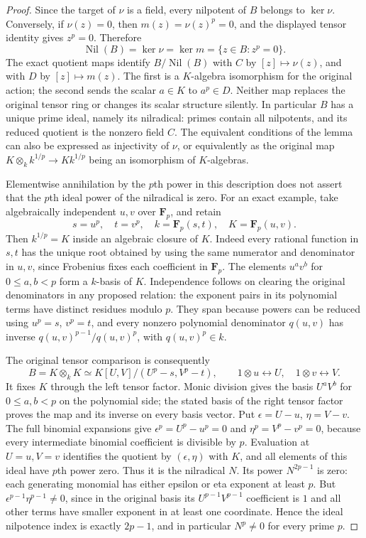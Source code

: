 \begin{proof}
Since the target of $\nu$ is a field, every
nilpotent of $B$ belongs to $\ker\nu$. Conversely,
if $\nu(z)=0$, then $m(z)=\nu(z)^p=0$, and the
displayed tensor identity gives $z^p=0$. Therefore
$$
\operatorname{Nil}(B)=\ker\nu=\ker m
=\{z\in B:z^p=0\}.
$$
The exact quotient maps identify
$B/\operatorname{Nil}(B)$ with $C$ by $[z]\mapsto\nu(z)$,
and with $D$ by $[z]\mapsto m(z)$. The first is a
$K$-algebra isomorphism for the original action;
the second sends the scalar $a\in K$ to $a^p\in D$.
Neither map replaces the original tensor ring or
changes its scalar structure silently. In particular
$B$ has a unique prime ideal, namely its nilradical:
primes contain all nilpotents, and its reduced
quotient is the nonzero field $C$. The equivalent
conditions of the lemma can also be expressed as
injectivity of $\nu$, or equivalently as the original
map $K\otimes_k k^{1/p}\to Kk^{1/p}$ being an
isomorphism of $K$-algebras.

Elementwise annihilation by the $p$th power in this
description does not assert that the $p$th ideal
power of the nilradical is zero. For an exact
example, take algebraically independent $u,v$
over $\mathbf F_p$, and retain
$$
s=u^p,\quad t=v^p,\quad
k=\mathbf F_p(s,t),\quad K=\mathbf F_p(u,v).
$$
Then $k^{1/p}=K$ inside an algebraic closure of $K$.
Indeed every rational function in $s,t$ has the
unique root obtained by using the same numerator
and denominator in $u,v$, since Frobenius fixes
each coefficient in $\mathbf F_p$. The elements
$u^a v^b$ for $0\leq a,b<p$ form a $k$-basis of
$K$. Independence follows on clearing the original
denominators in any proposed relation: the exponent
pairs in its polynomial terms have distinct residues
modulo $p$. They span because powers can be reduced
using $u^p=s$, $v^p=t$, and every nonzero polynomial
denominator $q(u,v)$ has inverse
$q(u,v)^{p-1}/q(u,v)^p$, with $q(u,v)^p\in k$.

The original tensor comparison is consequently
$$
B=K\otimes_k K\simeq
K[U,V]/(U^p-s,V^p-t),\qquad
1\otimes u\longleftrightarrow U,\quad
1\otimes v\longleftrightarrow V.
$$
It fixes $K$ through the left tensor factor.
Monic division gives the basis $U^aV^b$ for
$0\leq a,b<p$ on the polynomial side; the stated
basis of the right tensor factor proves the map
and its inverse on every basis vector. Put
$\epsilon=U-u$, $\eta=V-v$. The full binomial
expansions give $\epsilon^p=U^p-u^p=0$ and
$\eta^p=V^p-v^p=0$, because every intermediate
binomial coefficient is divisible by $p$.
Evaluation at $U=u,V=v$ identifies the quotient
by $(\epsilon,\eta)$ with $K$, and all elements
of this ideal have $p$th power zero. Thus it is
the nilradical $N$. Its power $N^{2p-1}$ is zero:
each generating monomial has either epsilon or
eta exponent at least $p$. But
$\epsilon^{p-1}\eta^{p-1}\neq0$, since in the
original basis its $U^{p-1}V^{p-1}$ coefficient
is $1$ and all other terms have smaller exponent
in at least one coordinate. Hence the ideal
nilpotence index is exactly $2p-1$, and in
particular $N^p\neq0$ for every prime $p$.
\end{proof}